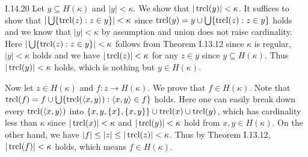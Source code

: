 \documentclass[12pt]{article}
\begin{document}
\begin{customthm}{I.14.20}
  Let $y\subseteq H(\kappa)$ and $|y|<\kappa$. We show that $|\mathop{\mathrm{trcl}}(y)|<\kappa$. It suffices to show that $|\bigcup\{\mathop{\mathrm{trcl}}(z):z\in y\}|<\kappa$ since $\mathop{\mathrm{trcl}}(y)=y\cup\bigcup\{\mathop{\mathrm{trcl}}(z):z\in y\}$ holds and we know that $|y|<\kappa$ by assumption and union does not raise cardinality. Here $|\bigcup\{\mathop{\mathrm{trcl}}(z):z\in y\}|<\kappa$ follows from Theorem I.13.12 since $\kappa$ is regular, $|y|<\kappa$ holds and we have $|\mathop{\mathrm{trcl}}(z)|<\kappa$ for any $z\in y$ since $y\subseteq H(\kappa)$. Thus $|\mathop{\mathrm{trcl}}(y)|<\kappa$ holds, which is nothing but $y\in H(\kappa)$.

  Now let $z\in H(\kappa)$ and $f:z\rightarrow H(\kappa)$. We prove that $f\in H(\kappa)$. Note that $\mathop{\mathrm{trcl}}(f)=f\cup\bigcup\{\mathop{\mathrm{trcl}}(\langle x,y\rangle):\langle x,y\rangle\in f\}$ holds. Here one can easily break down every $\mathop{\mathrm{trcl}}(\langle x,y\rangle)$ into $\{x,y,\{x\},\{x,y\}\}\cup\mathop{\mathrm{trcl}}(x)\cup\mathop{\mathrm{trcl}}(y)$, which has cardinality less than $\kappa$ since $|\mathop{\mathrm{trcl}}(x)|<\kappa$ and $|\mathop{\mathrm{trcl}}(y)|<\kappa$ hold from $x,y\in H(\kappa)$. On the other hand, we have $|f|\leq|z|\leq|\mathop{\mathrm{trcl}}(z)|<\kappa$. Thus by Theorem I.13.12, $|\mathop{\mathrm{trcl}}(f)|<\kappa$ holds, which means $f\in H(\kappa)$.
\end{customthm}
\end{document}
